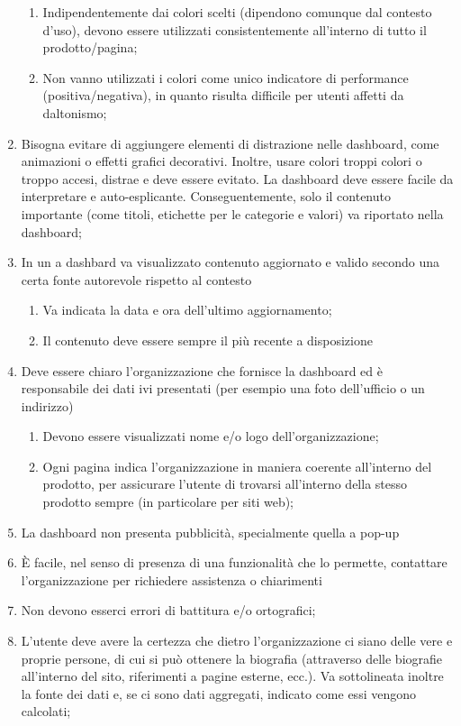 \begin{enumerate}
    \begin{enumerate}
        \item Indipendentemente dai colori scelti (dipendono comunque dal contesto d'uso), devono essere utilizzati consistentemente all'interno di tutto il prodotto/pagina;
        \item Non vanno utilizzati i colori come unico indicatore di performance (positiva/negativa), in quanto risulta difficile per utenti affetti da daltonismo;
    \end{enumerate}
    \item Bisogna evitare di aggiungere elementi di distrazione nelle dashboard, come animazioni o effetti grafici decorativi. Inoltre, usare colori troppi colori o troppo accesi, distrae e deve essere evitato. La dashboard deve essere facile da interpretare e auto-esplicante. Conseguentemente, solo il contenuto importante (come titoli, etichette per le categorie e valori) va riportato nella dashboard;
    \item In un a dashbard va visualizzato contenuto aggiornato e valido secondo una certa fonte autorevole rispetto al contesto
    \begin{enumerate}
        \item Va indicata la data e ora dell'ultimo aggiornamento;
        \item Il contenuto deve essere sempre il più recente a disposizione
    \end{enumerate}
    \item Deve essere chiaro l'organizzazione che fornisce la dashboard ed è responsabile dei dati ivi presentati (per esempio una foto dell'ufficio o un indirizzo)
    \begin{enumerate}
        \item Devono essere visualizzati nome e/o logo dell'organizzazione;
        \item Ogni pagina indica l'organizzazione in maniera coerente all'interno del prodotto, per assicurare l'utente di trovarsi all'interno della stesso prodotto sempre (in particolare per siti web);
    \end{enumerate}
    \item La dashboard non presenta pubblicità, specialmente quella a pop-up
    \item \`E facile, nel senso di presenza di una funzionalità che lo permette, contattare l'organizzazione per richiedere assistenza o chiarimenti
    \item Non devono esserci errori di battitura e/o ortografici;
    \item L'utente deve avere la certezza che dietro l'organizzazione ci siano delle vere e proprie persone, di cui si può ottenere la biografia (attraverso delle biografie all'interno del sito, riferimenti a pagine esterne, ecc.). Va sottolineata inoltre la fonte dei dati e, se ci sono dati aggregati, indicato come essi vengono calcolati;

\end{enumerate}
